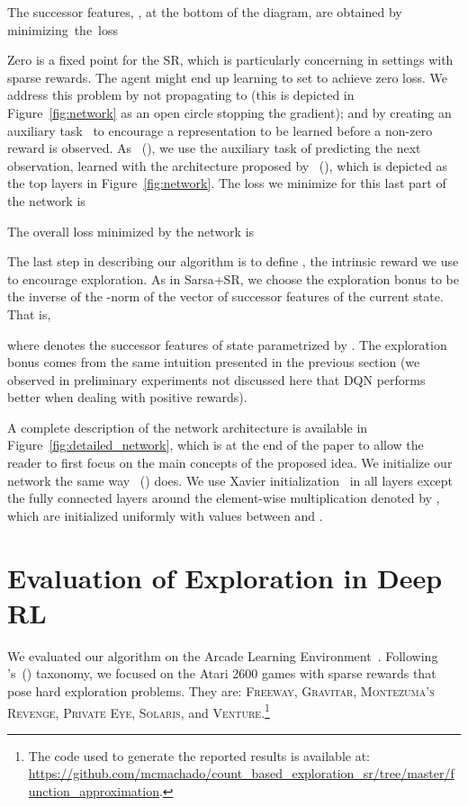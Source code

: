 \documentclass[letterpaper]{article} \usepackage{aaai20}  \usepackage{times}  \usepackage{helvet} \usepackage{courier}  \usepackage[hyphens]{url}  \usepackage{graphicx} \urlstyle{rm} \def\UrlFont{\rm}  \usepackage{graphicx}  \frenchspacing  \setlength{\pdfpagewidth}{8.5in}  \setlength{\pdfpageheight}{11in}  \usepackage{booktabs}
\begin{document}
The successor features, , at the bottom of the diagram, are obtained by minimizing~the~loss

Zero is a fixed point for the SR, which is particularly concerning in settings with sparse rewards. The agent might end up learning to set  to achieve zero loss. We address this problem by not propagating  to  (this is depicted in Figure~\ref{fig:network} as an open circle stopping the gradient); and by creating an auxiliary task~\cite{Jaderberg17} to encourage a representation to be learned before a non-zero reward is observed. As \citeauthor{Machado18b}~(\citeyear{Machado18b}), we use the auxiliary task of predicting the next observation, learned with the architecture proposed by \citeauthor{Oh15}~(\citeyear{Oh15}), which is depicted as the top layers in Figure~\ref{fig:network}. The loss we minimize for this last part of the network is 

The overall loss minimized by the network is 

The last step in describing our algorithm is to define , the intrinsic reward we use to encourage exploration. As in Sarsa+SR, we choose the exploration bonus to be the inverse of the -norm of the vector of successor features of the current state. That is,

where  denotes the successor features of state  parametrized by . The exploration bonus comes from the same intuition presented in the previous section (we observed in preliminary experiments not discussed here that DQN performs better when dealing with positive rewards). 

A complete description of the network architecture is available in Figure~\ref{fig:detailed_network}, which is at the end of the paper to allow the reader to first focus on the main concepts of the proposed idea. We initialize our network the same way \citeauthor{Oh15}~(\citeyear{Oh15}) does. We use Xavier initialization~\cite{Glorot10} in all layers except the fully connected layers around the element-wise multiplication denoted by , which are initialized uniformly with values between  and . 

\section{Evaluation of Exploration in Deep RL}
\label{sec:evaluation}

We evaluated our algorithm on the Arcade Learning Environment~\cite{Bellemare13}. Following \citeauthor{Bellemare16}'s~(\citeyear{Bellemare16}) taxonomy, we focused on the Atari 2600 games with sparse rewards that pose hard exploration problems. They are: \textsc{Freeway, Gravitar, Montezuma's Revenge, Private Eye, Solaris}, and \textsc{Venture}.\footnote{The code used to generate the reported results is available at:\\
\url{https://github.com/mcmachado/count_based_exploration_sr/tree/master/function_approximation}.}
\end{document}

